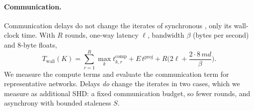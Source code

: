 \paragraph{Communication.}
Communication delays do not change the iterates of synchronous \feddbn{}, only its
wall-clock time. With $R$ rounds, one-way latency $\ell$, bandwidth $\beta$ (bytes per second)
and 8-byte floats,
\begin{equation}
  \label{eq:wallclock}
  T_{\mathrm{wall}}(K)=\sum_{r=1}^{R}\max_k t^{\mathrm{comp}}_{k,r}
  +E\,t^{\mathrm{proj}}+R\Big(2\ell+\frac{2\cdot 8\,md}{\beta}\Big).
\end{equation}
We measure the compute terms and evaluate the communication term for representative
networks. Delays \emph{do} change the iterates in two cases, which we measure as additional
SHD: a fixed communication budget, so fewer rounds, and asynchrony with bounded staleness $S$.
